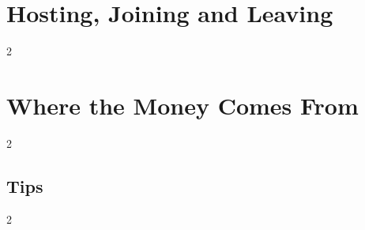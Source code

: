 \documentclass[12pt,letterpaper]{article}
\begin{document}
\renewcommand{\secstatus}{THE LOBBY \quad // \quad THE HOST \quad // \quad SEATS AND BOTS}
\chapter{Hosting, Joining and Leaving}
\begin{multicols}{2}
\end{multicols}

\renewcommand{\secstatus}{\MakeUppercase{\V{finderscut}} \quad // \quad \MakeUppercase{\V{root}} AND \MakeUppercase{\V{sudo}} \quad // \quad CASH}
\chapter{Where the Money Comes From}
\begin{multicols}{2}
\end{multicols}

\renewcommand{\secstatus}{EARLY \quad // \quad MIDDLE \quad // \quad LATE}
\vspace{24pt}\section{Tips}                  %
\begin{multicols}{2}
\end{multicols}

\renewcommand{\secstatus}{THE RULES \quad // \quad THE PC}
\end{document}
